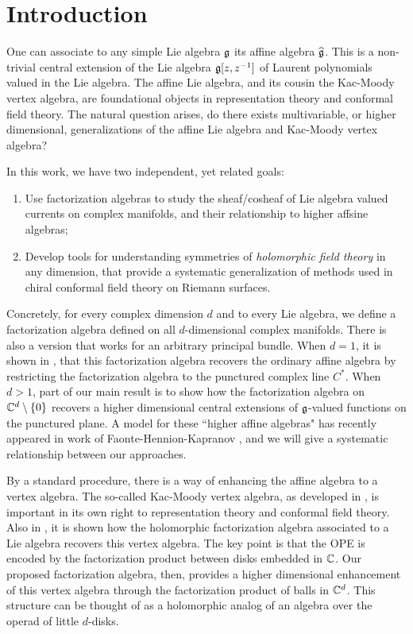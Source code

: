 \section*{}

\section*{Introduction}

One can associate to any simple Lie algebra $\mathfrak g$ its affine algebra $\widehat{\mathfrak g}$. 
This is a non-trivial central extension of the Lie algebra $\mathfrak g[z,z^{-1}]$ of Laurent polynomials valued in the Lie algebra. 
The affine Lie algebra, and its cousin the Kac-Moody vertex algebra, are foundational objects in representation theory and conformal field theory. 
The natural question arises, do there exists multivariable, or higher dimensional, generalizations of the affine Lie algebra and Kac-Moody vertex algebra? 

In this work, we have two independent, yet related goals:

\begin{enumerate}
\item Use factorization algebras to study the sheaf/cosheaf of Lie algebra valued currents on complex manifolds, and their relationship to higher affsine algebras;
\item Develop tools for understanding symmetries of {\em holomorphic field theory} in any dimension, that provide a systematic generalization of methods used in chiral conformal field theory on Riemann surfaces.
\end{enumerate}

Concretely, for every complex dimension $d$ and to every Lie algebra, we define a factorization algebra defined on all $d$-dimensional complex manifolds. 
There is also a version that works for an arbitrary principal bundle. 
When $d=1$, it is shown in \cite{CG1}, that this factorization algebra recovers the ordinary affine algebra by restricting the factorization algebra to the punctured complex line $C^*$. 
When $d > 1$, part of our main result is to show how the factorization algebra on $\mathbb C^d \setminus \{0\}$ recovers a higher dimensional central extensions of $\mathfrak g$-valued functions on the punctured plane. 
A model for these ``higher affine algebras" has recently appeared in work of Faonte-Hennion-Kapranov \cite{FHK}, and we will give a systematic relationship between our approaches. 

By a standard procedure, there is a way of enhancing the affine algebra to a vertex algebra. 
The so-called Kac-Moody vertex algebra, as developed in \cite{IgorKM, KacVertex, BorcherdsVertex}, is important in its own right to representation theory and conformal field theory. 
Also in \cite{CG1}, it is shown how the holomorphic factorization algebra associated to a Lie algebra recovers this vertex algebra. 
The key point is that the OPE is encoded by the factorization product between disks embedded in $\mathbb C$. 
Our proposed factorization algebra, then, provides a higher dimensional enhancement of this vertex algebra through the factorization product of balls in $\mathbb C^d$. 
This structure can be thought of as a holomorphic analog of an algebra over the operad of little $d$-disks.


